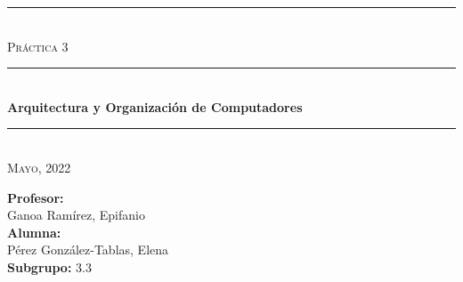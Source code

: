 \begin{titlepage}
	\begin{center}
		\rule{15cm}{0pt} \\
		[3cm]
		\textsc{\Large Práctica 3} \\
		\rule{15cm}{1pt} \\
		[0.25cm]
		\huge{\bfseries Arquitectura y Organización de Computadores} \\
		\rule{15cm}{1pt} \\
		[0.25cm]
		\textsc{\Large Mayo, 2022}\\
		[9cm]
	\end{center}
	\begin{flushright}
		\textbf{Profesor:} \\
		Ganoa Ramírez, Epifanio\\
		[0.25cm]
		\textbf{Alumna:} \\
		Pérez González-Tablas, Elena \\	
		[0.25cm]
		\textbf{Subgrupo:} 3.3 \\
	\end{flushright}
\end{titlepage}
\newpage
\begin{titlepage}
	\begin{flushleft}
	\end{flushleft}
\end{titlepage}